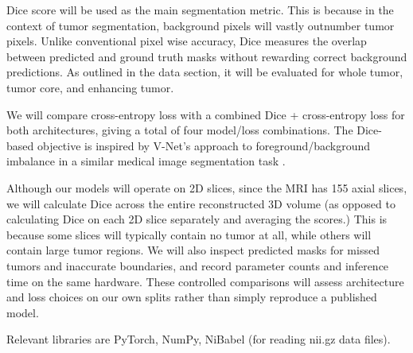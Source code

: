 Dice score will be used as the main segmentation metric. This is because in the context of tumor segmentation, background pixels will vastly outnumber tumor pixels. Unlike conventional pixel wise accuracy, Dice measures the overlap between predicted and ground truth masks without rewarding correct background predictions. As outlined in the data section, it will be evaluated for whole tumor, tumor core, and enhancing tumor. 

We will compare cross-entropy loss with a combined Dice + cross-entropy loss for both architectures, giving a total of four model/loss combinations. The Dice-based objective is inspired by V-Net's approach to foreground/background imbalance in a similar medical image segmentation task \cite{vnet}.

Although our models will operate on 2D slices, since the MRI has 155 axial slices, we will calculate Dice across the entire reconstructed 3D volume (as opposed to calculating Dice on each 2D slice separately and averaging the scores.) This is because some slices will typically contain no tumor at all, while others will contain large tumor regions. We will also inspect predicted masks for missed tumors and inaccurate boundaries, and record parameter counts and inference time on the same hardware. These controlled comparisons will assess architecture and loss choices on our own splits rather than simply reproduce a published model.


Relevant libraries are PyTorch, NumPy, NiBabel (for reading nii.gz data files).
